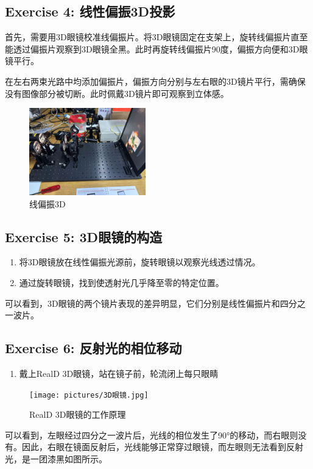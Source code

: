 \documentclass{ctexart}
\begin{document}
\subsection{Exercise 4: 线性偏振3D投影}
首先，需要用3D眼镜校准线偏振片。将3D眼镜固定在支架上，旋转线偏振片直至能透过偏振片观察到3D眼镜全黑。此时再旋转线偏振片90度，偏振方向便和3D眼镜平行。

在左右两束光路中均添加偏振片，偏振方向分别与左右眼的3D镜片平行，需确保没有图像部分被切断。此时佩戴3D镜片即可观察到立体感。
\begin{figure}[H]
    \centering
    \includegraphics[width=0.45\textwidth,height=0.3\textwidth]{pictures/微信图片_20241212140320.jpg}
    \caption{线偏振3D}
\end{figure}

\subsection{Exercise 5: 3D眼镜的构造}
\begin{enumerate}
    \item 将3D眼镜放在线性偏振光源前，旋转眼镜以观察光线透过情况。
    \item 通过旋转眼镜，找到使透射光几乎降至零的特定位置。
\end{enumerate}
可以看到，3D眼镜的两个镜片表现的差异明显，它们分别是线性偏振片和四分之一波片。

\subsection{Exercise 6: 反射光的相位移动}
\begin{enumerate}
    \item 戴上RealD 3D眼镜，站在镜子前，轮流闭上每只眼睛
\end{enumerate}
\begin{figure}[H]
    \centering
    \texttt{[image: pictures/3D眼镜.jpg]}
    \caption{RealD 3D眼镜的工作原理}
\end{figure}
可以看到，左眼经过四分之一波片后，光线的相位发生了90°的移动，而右眼则没有。因此，右眼在镜面反射后，光线能够正常穿过眼镜，而左眼则无法看到反射光，是一团漆黑如图所示。
\end{document}
